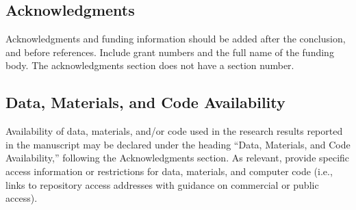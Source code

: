 \documentclass[12pt]{spieman}  %
\begin{document}
\begin{spacing}{2}
\subsection{Acknowledgments}
Acknowledgments and funding information should be added after the conclusion,
and before references. Include grant numbers and the full name of the funding
body. The acknowledgments section does not have a section number.

\subsection{Data, Materials, and Code Availability}
Availability of data, materials, and/or code used in the research results
reported in the manuscript may be declared under the heading ``Data, Materials,
and Code Availability,'' following the Acknowledgments section. As relevant,
provide specific access information or restrictions for data, materials, and
computer code (i.e., links to repository access addresses with guidance on
commercial or public access).





\end{spacing}
\end{document}
